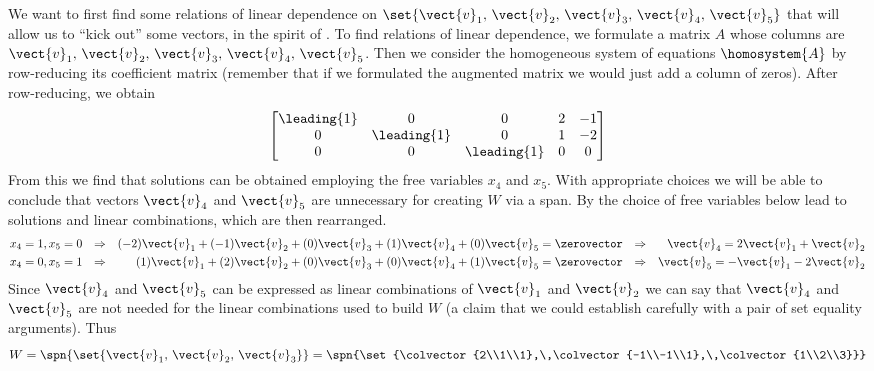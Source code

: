 We want to first find some relations of linear dependence on $\set{\vect{v}_1,\,\vect{v}_2,\,\vect{v}_3,\,\vect{v}_4,\,\vect{v}_5}$ that will allow us to ``kick out'' some vectors, in the spirit of .  To find relations of linear dependence, we formulate a matrix $A$ whose columns are $\vect{v}_1,\,\vect{v}_2,\,\vect{v}_3,\,\vect{v}_4,\,\vect{v}_5$.  Then we consider the homogeneous system of equations $\homosystem{A}$ by row-reducing its coefficient matrix (remember that if we formulated the augmented matrix we would just add a column of zeros).  After row-reducing, we obtain
%
\begin{equation*}
\begin{bmatrix}
\leading{1} & 0 & 0 & 2 & -1\\
0 & \leading{1} & 0 & 1 & -2\\
0 & 0 & \leading{1} & 0 & 0
\end{bmatrix}
\end{equation*}
%
From this we find that solutions can be obtained employing the free variables $x_4$ and $x_5$.  With appropriate choices we will be able to conclude that vectors $\vect{v}_4$ and $\vect{v}_5$ are unnecessary for creating 
$W$ via a span.  By  the choice of free variables below lead to solutions and linear combinations, which are then rearranged.
%
\begin{align*}
x_4=1, x_5=0&&\Rightarrow&&(-2)\vect{v}_1+(-1)\vect{v}_2+(0)\vect{v}_3+(1)\vect{v}_4+(0)\vect{v}_5=\zerovector&&\Rightarrow&&\vect{v}_4=2\vect{v}_1+\vect{v}_2\\
x_4=0, x_5=1&&\Rightarrow&&(1)\vect{v}_1+(2)\vect{v}_2+(0)\vect{v}_3+(0)\vect{v}_4+(1)\vect{v}_5=\zerovector&&\Rightarrow&&\vect{v}_5=-\vect{v}_1-2\vect{v}_2\\
\end{align*}
%
Since $\vect{v}_4$ and $\vect{v}_5$ can be expressed as linear combinations of $\vect{v}_1$ and $\vect{v}_2$  we can say that $\vect{v}_4$ and $\vect{v}_5$ are not needed for the linear combinations used to build $W$ (a claim that we could establish carefully with a pair of set equality arguments).  Thus 
%
\begin{equation*}
W=\spn{\set{\vect{v}_1,\,\vect{v}_2,\,\vect{v}_3}}=\spn{\set{\colvector{2\\1\\1},\,\colvector{-1\\-1\\1},\,\colvector{1\\2\\3}}}
\end{equation*}
